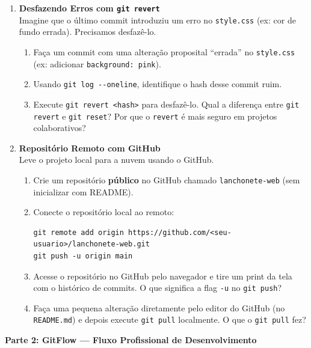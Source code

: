 \documentclass[12pt]{article}
\begin{document}
\begin{enumerate}[label=\textbf{Questão \arabic*:}, leftmargin=1.5cm, labelsep=0.5cm]
    \item \textbf{Desfazendo Erros com \texttt{git revert}} \\
    Imagine que o último commit introduziu um erro no \texttt{style.css} (ex: cor de fundo errada). Precisamos desfazê-lo.
    \begin{enumerate}[label=\alph*)]
        \item Faça um commit com uma alteração proposital ``errada'' no \texttt{style.css} (ex: adicionar \texttt{background: pink}).
        \item Usando \texttt{git log -{-}oneline}, identifique o hash desse commit ruim.
        \item Execute \texttt{git revert <hash>} para desfazê-lo. Qual a diferença entre \texttt{git revert} e \texttt{git reset}? Por que o \texttt{revert} é mais seguro em projetos colaborativos?
    \end{enumerate}

    \item \textbf{Repositório Remoto com GitHub} \\
    Leve o projeto local para a nuvem usando o GitHub.
    \begin{enumerate}[label=\alph*)]
        \item Crie um repositório \textbf{público} no GitHub chamado \texttt{lanchonete-web} (sem inicializar com README).
        \item Conecte o repositório local ao remoto:
\begin{lstlisting}
git remote add origin https://github.com/<seu-usuario>/lanchonete-web.git
git push -u origin main
\end{lstlisting}
        \item Acesse o repositório no GitHub pelo navegador e tire um print da tela com o histórico de commits. O que significa a flag \texttt{-u} no \texttt{git push}?
        \item Faça uma pequena alteração diretamente pelo editor do GitHub (no \texttt{README.md}) e depois execute \texttt{git pull} localmente. O que o \texttt{git pull} fez?
    \end{enumerate}

\end{enumerate}

\vspace{0.5cm}
\begin{center}
    \textcolor{meuazul}{\Large \textbf{Parte 2: GitFlow --- Fluxo Profissional de Desenvolvimento}}
\end{center}
\vspace{0.2cm}
\end{document}

